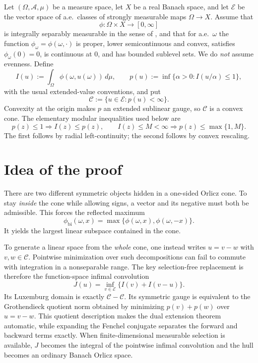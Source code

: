 \documentclass[11pt]{article}
\theoremstyle{definition}
\newcommand{\cC}{\mathcal C}
\newcommand{\cE}{\mathcal E}
\newcommand{\phib}{\phi_{\mathrm{bi}}}
\begin{document}
Let $(\Omega,\mathcal A,\mu)$ be a measure space, let $X$ be a real Banach
space, and let $\cE$ be the vector space of a.e.\ classes of strongly
measurable maps $\Omega\to X$.  Assume that
\[
 \phi\colon\Omega\times X\longrightarrow[0,\infty]
\]
is integrally separably measurable in the sense of \cite{Ruf2023}, and that
for a.e.\ $\omega$ the function $\phi_\omega=\phi(\omega,\cdot)$ is proper,
lower semicontinuous and convex, satisfies $\phi_\omega(0)=0$, is continuous
at $0$, and has bounded sublevel sets.  We do \emph{not} assume evenness.
Define
\[
 I(u):=\int_\Omega\phi(\omega,u(\omega))\,d\mu,\qquad
 p(u):=\inf\{\alpha>0:I(u/\alpha)\le1\},
\]
with the usual extended-value conventions, and put
\[
 \cC:=\{u\in\cE:p(u)<\infty\}.
\]
Convexity at the origin makes $p$ an extended sublinear gauge, so $\cC$ is a
convex cone.  The elementary modular inequalities used below are
\[
 p(z)\le1\Longrightarrow I(z)\le p(z),\qquad
 I(z)\le M<\infty\Longrightarrow p(z)\le\max\{1,M\}.
\tag{2.1}\label{eq:modular-gauge}
\]
The first follows by radial left-continuity; the second follows by convex
rescaling.

\section{Idea of the proof}

There are two different symmetric objects hidden in a one-sided Orlicz cone.
To stay \emph{inside} the cone while allowing signs, a vector and its negative
must both be admissible.  This forces the reflected maximum
\[
 \phib(\omega,x)=\max\{\phi(\omega,x),\phi(\omega,-x)\}.
\]
It yields the largest linear subspace contained in the cone.

To generate a linear space from the \emph{whole} cone, one instead writes
$u=v-w$ with $v,w\in\cC$.  Pointwise minimization over such decompositions
can fail to commute with integration in a nonseparable range.  The key
selection-free replacement is therefore the function-space infimal
convolution
\[
 J(u)=\inf_{v\in\cE}\{I(v)+I(v-u)\}.
\]
Its Luxemburg domain is exactly $\cC-\cC$.  Its symmetric gauge is equivalent
to the Grothendieck quotient norm obtained by minimizing $p(v)+p(w)$ over
$u=v-w$.  This quotient description makes the dual extension theorem
automatic, while expanding the Fenchel conjugate separates the forward and
backward terms exactly.  When finite-dimensional measurable selection is
available, $J$ becomes the integral of the pointwise infimal convolution and
the hull becomes an ordinary Banach Orlicz space.
\end{document}
